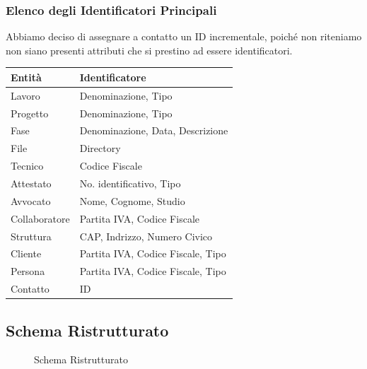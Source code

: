 \documentclass{elegantbook}
\begin{document}
	\subsubsection{Elenco degli Identificatori Principali}
	Abbiamo deciso di assegnare a contatto un ID incrementale, poiché non riteniamo non siano presenti attributi che si prestino ad essere identificatori.
	\begin{longtable}{|p{3cm}|p{12cm}|}
		\hline
		\textbf{Entità} & \textbf{Identificatore} \\
		\hline
		Lavoro & Denominazione, Tipo\\
		\hline
		Progetto & Denominazione, Tipo\\
		\hline
		Fase & Denominazione, Data, Descrizione\\
		\hline
		File & Directory\\
		\hline
		Tecnico & Codice Fiscale\\
		\hline 
		Attestato & No. identificativo, Tipo\\
		\hline
		Avvocato & Nome, Cognome, Studio\\
		\hline
		Collaboratore & Partita IVA, Codice Fiscale \\
		\hline
		Struttura & CAP, Indrizzo, Numero Civico\\
		\hline
		Cliente & Partita IVA, Codice Fiscale, Tipo\\
		\hline
		Persona & Partita IVA, Codice Fiscale, Tipo\\
		\hline
		Contatto & ID\\
		\hline
	\end{longtable}
	\newpage
	\subsection{Schema Ristrutturato}
		\begin{figure}[H]
			\centering
                        \caption{Schema Ristrutturato}
		\end{figure}
	\newpage
\end{document}
